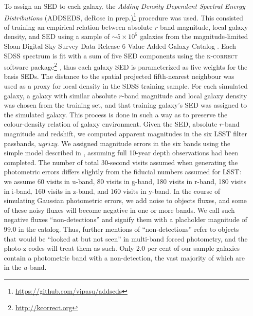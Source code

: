To assign an SED to each galaxy, the {\it Adding Density Dependent Spectral Energy Distributions} (\textsc{ADDSEDS}, deRose in prep.)\footnote{\url{https://github.com/vipasu/addseds}} procedure was used. This consisted of training an empirical relation between absolute $r$-band magnitude, local galaxy density, and SED using a sample of $\sim 5\times 10^{5}$ galaxies from the magnitude-limited Sloan Digital Sky Survey Data Release 6 Value Added Galaxy Catalog \citep{Blanton:05}.  Each SDSS spectrum is fit with a sum of five SED components using the \textsc{k-correct } software package\footnote{\url{http://kcorrect.org}} \citep{Blanton:07}, thus each galaxy SED is parameterized as five weights for the basis SEDs. The distance to the spatial projected fifth-nearest neighbour was used as a proxy for local density in the SDSS training sample. For each simulated galaxy, a galaxy with similar absolute $r$-band magnitude and local galaxy density was chosen from the training set, and that training galaxy's SED was assigned to the simulated galaxy.  This process is done in such a way as to preserve the colour-density relation of galaxy environment.  Given the SED, absolute $r$-band magnitude and redshift, we computed apparent magnitudes in the six LSST filter passbands, $ugrizy$. We assigned magnitude errors in the six bands using the simple model described in \citet{Ivezic:08}, assuming full 10-year depth observations had been completed.  The number of total 30-second visits assumed when generating the photometric errors differs slightly from the fiducial numbers assumed for LSST: we assume 60 visits in u-band, 80 visits in g-band, 180 visits in r-band, 180 visits in i-band, 160 visits in z-band, and 160 visits in y-band.
In the course of simulating Gaussian photometric errors, we add noise to objects fluxes, and some of these noisy fluxes will become negative in one or more bands.  We call such negative fluxes ``non-detections'' and signify them with a placholder magnitude of 99.0 in the catalog.  Thus, further mentions of ``non-detections'' refer to objects that would be ``looked at but not seen'' in multi-band forced photometry, and the photo-z codes will treat them as such.  Only 2.0 per cent of our sample galaxies contain a photometric band with a non-detection, the vast majority of which are in the $u$-band.

